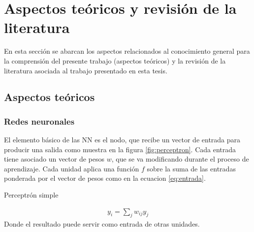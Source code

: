 \chapter{Aspectos teóricos y revisión de la literatura}

En esta sección se abarcan los aspectos relacionados al conocimiento general para la comprensión del presente trabajo (aspectos teóricos) y la revisión de la literatura asociada al trabajo presentado en esta tesis. %




\section{Aspectos teóricos}
\subsection{Redes neuronales}
El elemento básico de las NN es el nodo, que recibe un vector de entrada para producir una salida como muestra en la figura \ref{fig:perceptron}. Cada entrada tiene asociado un vector de pesos $w$, que se va modificando durante el proceso de aprendizaje. Cada unidad aplica una función $f$ sobre la suma de las entradas ponderada por el vector de pesos como en la ecuacion \ref{eq:entrada}.
\begin{imagen}
	\scalebox{1.5}{}
	\caption{Perceptrón simple}
	\label{fig:perceptron}
\end{imagen}


\begin{eqnarray}
	y_{i} = \sum_{j} w_{ij}y_{j}\label{eq:entrada}
\end{eqnarray}
Donde el resultado puede servir como entrada de otras unidades.

